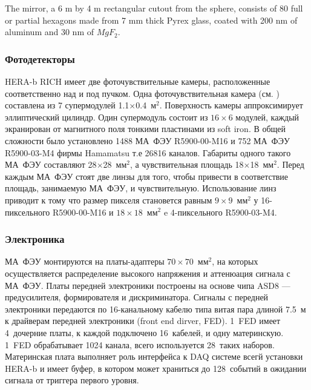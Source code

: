 
The mirror, a 6 m by 4 m rectangular cutout from the sphere, consists of 80 full or partial hexagons made from 7 mm thick Pyrex glass, coated with 200 nm of aluminum and 30 nm of $MgF_{2}$.

\subsubsection{Фотодетекторы}

HERA-b RICH имеет две фоточувствительные камеры, расположенные соответственно над и под пучком. Одна фоточувствительная камера (см. ) составлена из 7 супермодулей 1.1$\times$0.4~м$^2$. Поверхность камеры аппроксимирует эллиптический цилиндр. Один супермодуль состоит из $16 \times 6$ модулей, каждый экранирован от магнитного поля тонкими пластинами из soft iron. В общей сложности было установлено 1488 МА~ФЭУ R5900-00-M16 и 752 МА~ФЭУ R5900-03-M4 фирмы Hamamatsu т.е 26816 каналов. Габариты одного такого МА~ФЭУ составляют 28$\times$28~мм$^2$, а чувствительная площадь 18$\times$18~мм$^2$. Перед каждым МА~ФЭУ стоят две линзы для того, чтобы привести в соответствие площадь, занимаемую МА~ФЭУ, и чувствительную. Использование линз приводит к тому что размер пикселя становется равным $9 \times 9$~мм$^2$ у 16-пиксельного R5900-00-M16 и $18 \times 18$~мм$^2$ e 4-пиксельного R5900-03-M4.

\subsubsection{Электроника}

МА~ФЭУ монтируются на платы-адаптеры $70 \times 70$~мм$^2$, на которых осуществляется распределение высокого напряжения и аттенюация сигнала с МА~ФЭУ. Платы передней электроники построены на основе чипа ASD8 --- предусилителя, формирователя и дискриминатора. Сигналы с передней электроники передаются по 16-канальному кабелю типа витая пара длиной 7.5~м к драйверам передней электроники (front end dirver, FED). 1~FED имеет 4~дочерние платы, к каждой подключено 16~кабелей, и одну материнскую. 1~FED обрабатывает 1024 канала, всего используется 28~таких наборов. Материнская плата выполняет роль интерфейса к DAQ системе всегй установки HERA-b и имеет буфер, в котором может храниться до 128~событий в ожидании сигнала от триггера первого уровня.


